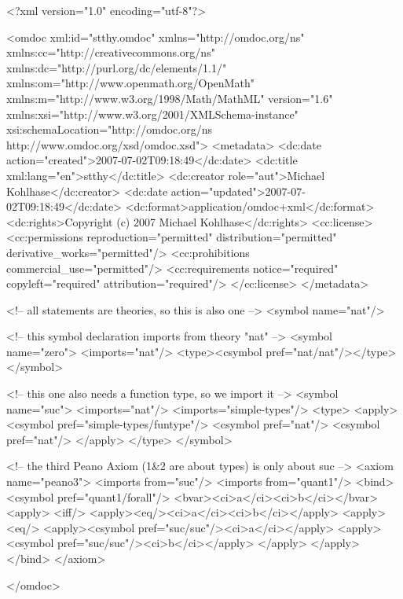 <?xml version="1.0" encoding="utf-8"?>

<omdoc xml:id="stthy.omdoc"
  xmlns="http://omdoc.org/ns"
  xmlns:cc="http://creativecommons.org/ns"
  xmlns:dc="http://purl.org/dc/elements/1.1/"
  xmlns:om="http://www.openmath.org/OpenMath"
  xmlns:m="http://www.w3.org/1998/Math/MathML"
  version="1.6"
  xmlns:xsi="http://www.w3.org/2001/XMLSchema-instance"
  xsi:schemaLocation="http://omdoc.org/ns
                      http://www.omdoc.org/xsd/omdoc.xsd">
<metadata>
  <dc:date action="created">2007-07-02T09:18:49</dc:date>
  <dc:title xml:lang="en">stthy</dc:title>
  <dc:creator role="aut">Michael Kohlhase</dc:creator>
  <dc:date action="updated">2007-07-02T09:18:49</dc:date>
  <dc:format>application/omdoc+xml</dc:format>
  <dc:rights>Copyright (c) 2007 Michael Kohlhase</dc:rights>
  <cc:license>
    <cc:permissions reproduction="permitted" distribution="permitted" derivative_works="permitted"/>
    <cc:prohibitions commercial_use="permitted"/>
    <cc:requirements notice="required" copyleft="required" attribution="required"/>
  </cc:license>
</metadata>

<!-- all statements are theories, so this is also one -->
<symbol name="nat"/>

<!-- this symbol declaration imports from theory "nat" --> 
<symbol name="zero">
  <imports="nat"/>
  <type><csymbol pref="nat/nat"/></type>
</symbol>

<!-- this one also needs a function type, so we import it -->
<symbol name="suc">
  <imports="nat"/>
  <imports="simple-types"/>
  <type>
    <apply>
      <csymbol pref="simple-types/funtype"/>
      <csymbol pref="nat"/>
      <csymbol pref="nat"/>
    </apply>
  </type>
</symbol>

<!-- the third Peano Axiom (1&2 are about types) is only about suc -->
<axiom name="peano3">
  <imports from="suc"/>
  <imports from="quant1"/>
  <bind>
    <csymbol pref="quant1/forall"/>
    <bvar><ci>a</ci><ci>b</ci></bvar>
    <apply>
      <iff/>
      <apply><eq/><ci>a</ci><ci>b</ci></apply>
      <apply><eq/>
        <apply><csymbol pref="suc/suc"/><ci>a</ci></apply>
        <apply><csymbol pref="suc/suc"/><ci>b</ci></apply>
      </apply>
    </apply>
  </bind>
</axiom>
      

</omdoc>
